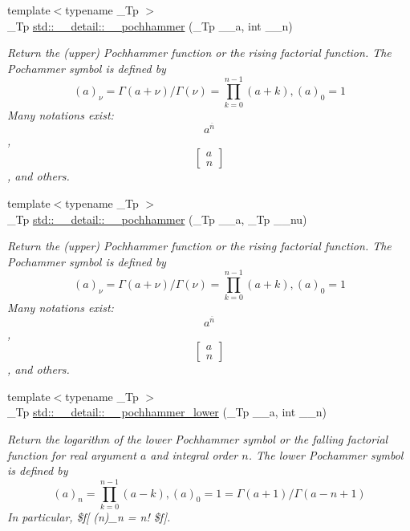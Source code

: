 \begin{DoxyCompactItemize}
{\footnotesize template$<$typename \+\_\+\+Tp $>$ }\\\+\_\+\+Tp \hyperlink{namespacestd_1_1____detail_aca07ee173947de27d63b2e2759a1b0c5}{std\+::\+\_\+\+\_\+detail\+::\+\_\+\+\_\+pochhammer} (\+\_\+\+Tp \+\_\+\+\_\+a, int \+\_\+\+\_\+n)
\begin{DoxyCompactList}\small\item\em Return the (upper) Pochhammer function or the rising factorial function. The Pochammer symbol is defined by \[ (a)_\nu = \Gamma(a + \nu) / \Gamma(\nu) = \prod_{k=0}^{n-1} (a + k), (a)_0 = 1 \] Many notations exist\+: \[ a^{\overline{n}} \], \[ \left[ \begin{array}{c} a \\ n \end{array} \right] \], and others. \end{DoxyCompactList}\item 
{\footnotesize template$<$typename \+\_\+\+Tp $>$ }\\\+\_\+\+Tp \hyperlink{namespacestd_1_1____detail_aa844ee309d6d977631302cb6cd7c4bdf}{std\+::\+\_\+\+\_\+detail\+::\+\_\+\+\_\+pochhammer} (\+\_\+\+Tp \+\_\+\+\_\+a, \+\_\+\+Tp \+\_\+\+\_\+nu)
\begin{DoxyCompactList}\small\item\em Return the (upper) Pochhammer function or the rising factorial function. The Pochammer symbol is defined by \[ (a)_\nu = \Gamma(a + \nu) / \Gamma(\nu) = \prod_{k=0}^{n-1} (a + k), (a)_0 = 1 \] Many notations exist\+: \[ a^{\overline{n}} \], \[ \left[ \begin{array}{c} a \\ n \end{array} \right] \], and others. \end{DoxyCompactList}\item 
{\footnotesize template$<$typename \+\_\+\+Tp $>$ }\\\+\_\+\+Tp \hyperlink{namespacestd_1_1____detail_a9660424661fca12b84325ad3c70fe1e1}{std\+::\+\_\+\+\_\+detail\+::\+\_\+\+\_\+pochhammer\+\_\+lower} (\+\_\+\+Tp \+\_\+\+\_\+a, int \+\_\+\+\_\+n)
\begin{DoxyCompactList}\small\item\em Return the logarithm of the lower Pochhammer symbol or the falling factorial function for real argument $ a $ and integral order $ n $. The lower Pochammer symbol is defined by \[ (a)_n = \prod_{k=0}^{n-1} (a - k), (a)_0 = 1 = \Gamma(a + 1) / \Gamma(a - n + 1) \] In particular, \$f\mbox{[} (n)\+\_\+n = n! \$f\mbox{]}. \end{DoxyCompactList}\item 

\end{DoxyCompactItemize}
